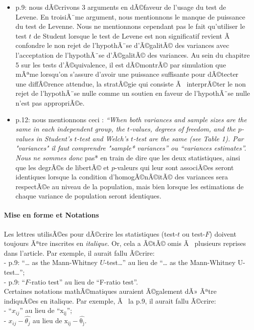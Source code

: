 \begin{appendix}
\begin{itemize}
\item
  p.9: nous dÃ©crivons 3 arguments en dÃ©faveur de l'usage du test de
  Levene. En troisiÃ¨me argument, nous mentionnons le manque de
  puissance du test de Levenne. Nous ne mentionnons cependant pas le
  fait qu'utiliser le test \(t\) de Student lorsque le test de Levene
  est non significatif revient Ã~ confondre le non rejet de l'hypothÃ¨se
  d'Ã©galitÃ© des variances avec l'acceptation de l'hypothÃ¨se
  d'Ã©galitÃ© des variances. Au sein du chapitre 5 sur les tests
  d'Ã©quivalence, il est dÃ©montrÃ© par simulation que mÃªme lorsqu'on
  s'assure d'avoir une puissance suffisante pour dÃ©tecter une
  diffÃ©rence attendue, la stratÃ©gie qui consiste Ã~ interprÃ©ter le
  non rejet de l'hypothÃ¨se nulle comme un soutien en faveur de
  l'hypothÃ¨se nulle n'est pas appropriÃ©e.
\item
  p.12: nous mentionnons ceci : \emph{``When both variances and sample
  sizes are the same in each independent group, the \(t\)-values,
  degrees of freedom, and the \(p\)-values in Student's \(t\)-test and
  Welch's \(t\)-test are the same (see Table 1)\emph{. Par "variances"
  il faut comprendre "}sample* variances'' ou ``variances
  \emph{estimates}''. Nous ne sommes donc }pas* en train de dire que les
  deux statistiques, ainsi que les degrÃ©s de libertÃ© et \(p\)-valeurs
  qui leur sont associÃ©es seront identiques lorsque la condition
  d'homogÃ©nÃ©itÃ© des variances sera respectÃ©e au niveau de la
  population, mais bien lorsque les estimations de chaque variance de
  population seront identiques.
\end{itemize}

\hypertarget{mise-en-forme-et-notations}{%
\paragraph{Mise en forme et
Notations}\label{mise-en-forme-et-notations}}

Les lettres utilisÃ©es pour dÃ©crire les statistiques (test-\(t\) ou
test-\(F\)) doivent toujours Ãªtre inscrites en \emph{italique}. Or,
cela a Ã©tÃ© omis Ã~ plusieurs reprises dans l'article. Par exemple, il
aurait fallu Ã©crire:\\
- p.9: ``\ldots{} as the Mann-Whitney \(U\)-test\ldots{}'' au lieu de
``\ldots{} as the Mann-Whitney U-test\ldots{}'';\\
- p.9: ``\(F\)-ratio test'' au lieu de ``F-ratio test''.\\
\newpage Certaines notations mathÃ©matiques auraient Ã©galement dÃ»
Ãªtre indiquÃ©es en italique. Par exemple, Ã~ la p.9, il aurait fallu
Ã©crire:\\
- ``\(x_{ij}\)'' au lieu de ``\(\mathrm{x_{ij}}\)'';\\
- \textbar{}\(x_{ij}-\hat{\theta_j}\)\textbar{} au lieu de
\textbar{}\(\mathrm{x_{ij}-\hat{\theta_j}}\)\textbar.


\end{appendix}
